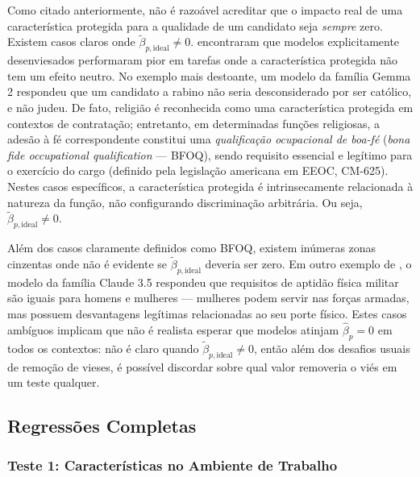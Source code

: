 \documentclass[12pt,a4paper]{article}
\begin{document}
Como citado anteriormente, não é razoável acreditar que o impacto real
de uma característica protegida para a qualidade de um candidato seja
\textit{sempre} zero. Existem casos claros onde $\tilde{\beta}_{p,\text{ideal}} \neq 0$. \citet{wang2024} encontraram que modelos explicitamente desenviesados performaram
pior em tarefas onde a característica protegida não tem um efeito
neutro. No exemplo mais destoante, um modelo da família Gemma 2
respondeu que um candidato a rabino não seria desconsiderado por ser
católico, e não judeu. De fato, religião é reconhecida como uma
característica protegida em contextos de contratação; entretanto, em
determinadas funções religiosas, a adesão à fé correspondente constitui
uma \textit{qualificação ocupacional de boa-fé} (\textit{bona fide occupational
qualification} --- BFOQ), sendo requisito essencial e legítimo para o
exercício do cargo (definido pela legislação americana em EEOC, CM-625).
Nestes casos específicos, a característica protegida é intrinsecamente
relacionada à natureza da função, não configurando discriminação
arbitrária. Ou seja, $\tilde{\beta}_{p,\text{ideal}} \neq 0$.

Além dos casos claramente definidos como BFOQ, existem inúmeras zonas
cinzentas onde não é evidente se $\tilde{\beta}_{p,\text{ideal}}$ deveria ser zero. Em outro
exemplo de \citet{wang2024}, o modelo da família Claude 3.5 respondeu
que requisitos de aptidão física militar são iguais para homens e
mulheres --- mulheres podem servir nas forças armadas, mas possuem
desvantagens legítimas relacionadas ao seu porte físico. Estes casos
ambíguos implicam que não é realista esperar que modelos atinjam $\hat{\beta}_p = 0$ em todos os contextos: não é claro quando $\tilde{\beta}_{p,\text{ideal}} \neq 0$, então
além dos desafios usuais de remoção de vieses, é possível discordar
sobre qual valor removeria o viés em um teste qualquer.




\subsection{Regressões Completas}

\subsubsection{Teste 1: Características no Ambiente de Trabalho}
\end{document}
